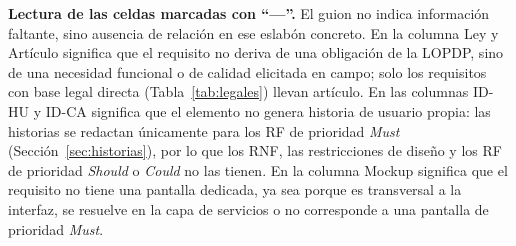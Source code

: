 \documentclass[journal,onecolumn]{IEEEtran}
\begin{document}
	\textbf{Lectura de las celdas marcadas con \enquote{---}.} El guion no indica
	información faltante, sino ausencia de relación en ese eslabón concreto. En la
	columna Ley y Artículo significa que el requisito no deriva de una obligación
	de la LOPDP, sino de una necesidad funcional o de calidad elicitada en campo;
	solo los requisitos con base legal directa (Tabla~\ref{tab:legales}) llevan
	artículo. En las columnas ID-HU y ID-CA significa que el elemento no genera
	historia de usuario propia: las historias se redactan únicamente para los RF
	de prioridad \emph{Must} (Sección~\ref{sec:historias}), por lo que los RNF,
	las restricciones de diseño y los RF de prioridad \emph{Should} o
	\emph{Could} no las tienen. En la columna Mockup significa que el requisito no
	tiene una pantalla dedicada, ya sea porque es transversal a la interfaz, se
	resuelve en la capa de servicios o no corresponde a una pantalla de prioridad
	\emph{Must}.
	
\end{document}
